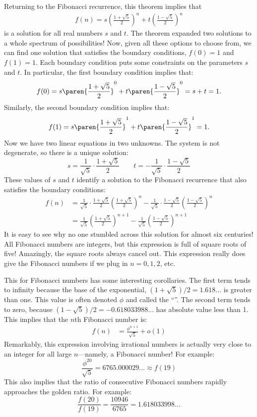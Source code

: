 Returning to the Fibonacci recurrence, this theorem implies that
\begin{align*}
  f(n) = s \left(\frac{1 + \sqrt{5}}{2}\right)^n + t \left(\frac{1 -
    \sqrt{5}}{2}\right)^n
\end{align*}
is a solution for all real numbers $s$ and $t$.  The theorem expanded
two solutions to a whole spectrum of possibilities!  Now, given all
these options to choose from, we can find one solution that satisfies
the boundary conditions, $f(0) = 1$ and $f(1) = 1$.  Each boundary
condition puts some constraints on the parameters $s$ and $t$.  In
particular, the first boundary condition implies that:
\[
f(0) = s \paren{\frac{1 + \sqrt{5}}{2}}^0 + t \paren{\frac{1 -
    \sqrt{5}}{2}}^0 = s + t = 1.
\]
Similarly, the second boundary condition implies that:
\[
f(1) = s \paren{\frac{1 + \sqrt{5}}{2}}^1 + t \paren{\frac{1 -
    \sqrt{5}}{2}}^1 = 1.
\]
Now we have two linear equations in two unknowns.  The system is not
degenerate, so there is a unique solution:
\[
s = \frac{1}{\sqrt{5}} \cdot \frac{1 + \sqrt{5}}{2}\qquad
t = - \frac{1}{\sqrt{5}} \cdot \frac{1 - \sqrt{5}}{2}
\]
These values of $s$ and $t$ identify a solution to the Fibonacci
recurrence that also satisfies the boundary conditions:
\begin{align*}
  f(n) & = \frac{1}{\sqrt{5}} \cdot \frac{1 + \sqrt{5}}{2} \left(\frac{1 + \sqrt{5}}{2}\right)^n-
  \frac{1}{\sqrt{5}} \cdot \frac{1 - \sqrt{5}}{2} \left(\frac{1 - \sqrt{5}}{2}\right)^n \\
  & = \frac{1}{\sqrt{5}} \left(\frac{1 + \sqrt{5}}{2}\right)^{n+1} -
  \frac{1}{\sqrt{5}} \left(\frac{1 - \sqrt{5}}{2}\right)^{n+1}
\end{align*}
It is easy to see why no one stumbled across this solution for almost
six centuries! All Fibonacci numbers are integers, but this expression
is full of square roots of five! Amazingly, the square roots always
cancel out. This expression really does give the Fibonacci numbers if
we plug in $n = 0, 1, 2$, etc.

This  for Fibonacci numbers has some interesting
corollaries.  The first term tends to infinity because the base of the
exponential, $(1+\sqrt{5})/2 = 1.618\ldots$ is greater than one.
This value is often denoted $\phi$ and called the ``''.
The second term tends to zero, because $(1-\sqrt{5})/2 =
-0.618033988\ldots$ has absolute value less than 1.  This implies that
the $n$th Fibonacci number is:
\begin{align*}
f(n) & = \frac{\phi^{n+1}}{\sqrt{5}} + o(1)
\end{align*}
Remarkably, this expression involving irrational numbers is actually
very close to an integer for all large $n$---namely, a Fibonacci
number!  For example:
\begin{equation*}
\frac{\phi^{20}}{\sqrt{5}} = 6765.000029\ldots \approx f(19)
\end{equation*}
This also implies that the ratio of consecutive
Fibonacci numbers rapidly approaches the golden ratio.  For example:
\begin{equation*}
\frac{f(20)}{f(19)} = \frac{10946}{6765} = 1.618033998\ldots
\end{equation*}

